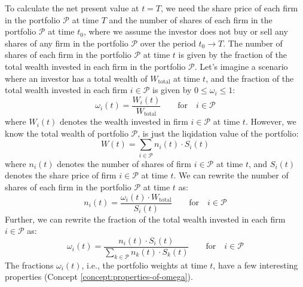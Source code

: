\documentclass[11pt]{article}
\theoremstyle{definition}
\begin{document}
To calculate the net present value at $t=T$, we need the share price of each firm in the portfolio $\mathcal{P}$ at time $T$ and the number of shares of each firm in the portfolio $\mathcal{P}$ at time $t_{0}$, 
where we assume the investor does not buy or sell any shares of any firm in the portfolio $\mathcal{P}$ over the period $t_{0}\rightarrow{T}$. The number of shares of each firm in the portfolio $\mathcal{P}$ at time $t$ is given by the fraction of the total wealth invested in each firm in the portfolio $\mathcal{P}$. Let's imagine a scenario where an investor has a total wealth of $W_{\text{total}}$ at time $t$, and the fraction of the total wealth invested in each firm $i\in\mathcal{P}$ is given by $0\leq{\omega_{i}}\leq{1}$:
\begin{equation*}
\omega_{i}(t) = \frac{W_{i}(t)}{W_{\text{total}}}\qquad\text{for}\quad{i\in\mathcal{P}}
\end{equation*}
where $W_{i}(t)$ denotes the wealth invested in firm $i\in\mathcal{P}$ at time $t$.
However, we know the total wealth of portfolio $\mathcal{P}$, is just the liqidation value of the portfolio: 
\begin{equation*}
W(t) = \sum_{i\in\mathcal{P}}n_{i}(t)\cdot{S_{i}(t)}
\end{equation*}
where $n_{i}(t)$ denotes the number of shares of firm $i\in\mathcal{P}$ at time $t$, and $S_{i}(t)$ denotes the share price of firm $i\in\mathcal{P}$ at time $t$. We can rewrite the number of shares of each firm in the portfolio $\mathcal{P}$ at time $t$ as:
\begin{equation*}
	n_{i}(t) = \frac{\omega_{i}(t)\cdot{W_{\text{total}}}}{S_{i}(t)}\qquad\text{for}\quad{i\in\mathcal{P}}
\end{equation*}
Further, we can rewrite the fraction of the total wealth invested in each firm $i\in\mathcal{P}$ as:
\begin{equation}\label{eqn:portfolio-weights-derivation}
\omega_{i}(t) = \frac{n_{i}(t)\cdot{S_{i}(t)}}{\displaystyle\sum_{k\in\mathcal{P}}n_{k}(t)\cdot{S}_{k}(t)}\qquad\text{for}\quad{i\in\mathcal{P}}
\end{equation}
The fractions $\omega_{i}(t)$, i.e., the portfolio weights at time $t$, have a few interesting properties (Concept \ref{concept:properties-of-omega}).
\end{document}
